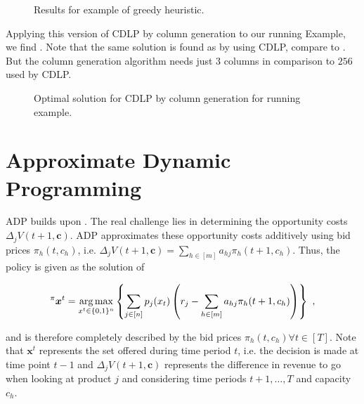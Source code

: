 \begin{figure}[ht]
	\caption{Results for example of greedy heuristic.\label{txt-CDLP-Greedy}}
	
\end{figure}

\vspace*{1cm}
\noindent{}
\vspace*{1cm}

Applying this version of CDLP by column generation to our running Example, we find . Note that the same solution is found as by using CDLP, compare to . But the column generation algorithm needs just $3$ columns in comparison to $256$ used by CDLP.

\begin{figure}[ht]
	\caption{Optimal solution for CDLP by column generation for running example.\label{txt-CDLP-ColGen-Stefan}}
	
\end{figure}


\section{Approximate Dynamic Programming}

ADP builds upon . The real challenge lies in determining the opportunity costs $\Delta_j V(t+1, \boldsymbol{c})$. ADP approximates these opportunity costs additively using bid prices $\pi_h(t, c_h)$, i.e. $\Delta_j V(t+1, \boldsymbol{c}) = \sum_{h \in [m]} a_{hj}\pi_{h}(t+1, c_h)$. Thus, the policy is given as the solution of

\begin{align}
^\pi \boldsymbol{x}^t = \operatorname*{arg\,max}_{x^t \in \{0,1\}^n}\left\{ \sum_{j \in [n]} p_j(x_t) \left( r_j - \sum_{h \in [m]} a_{hj}\pi_{h}(t+1, c_h) \right) \right\}~,\label{eq:ADP-online}
\end{align}

and is therefore completely described by the bid prices $\pi_h(t, c_h) \forall t \in [T]$. Note that $\boldsymbol{x}^t$ represents the set offered during time period $t$, i.e. the decision is made at time point $t-1$ and $\Delta_j V(t+1, \boldsymbol{c})$ represents the difference in revenue to go when looking at product $j$ and considering time periods $t+1, \dots, T$ and capacity $c_h$.

